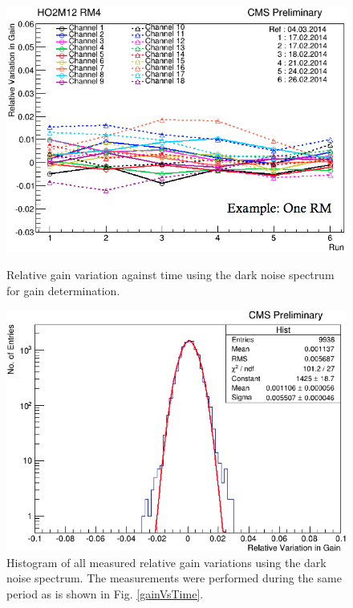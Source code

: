 \begin{figure}[h]
\centering
\begin{minipage}[t]{0.475\textwidth}
\includegraphics[width=\textwidth]{Bilder/gainOverTime.png}
\caption{Relative gain variation against time using the dark noise spectrum for gain determination.}
\label{gainVsTime}
\end{minipage}
\hspace{0.5cm}
\begin{minipage}[t]{0.475\textwidth}
\includegraphics[width=\textwidth]{Bilder/gainTotal.png}
\caption{Histogram of all measured relative gain variations using the dark noise spectrum. The measurements were performed during the same period as is shown in Fig. \ref{gainVsTime}.}
\label{gainHist}
\end{minipage}
\end{figure}
